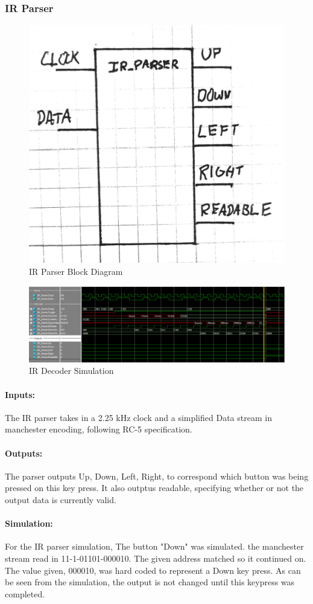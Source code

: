 \documentclass[]{article}
\begin{document}
\subsubsection{IR Parser}
\begin{figure}[H]\centering
    \includegraphics[width=0.5\linewidth]{figures/IR_Parser_Block.jpg}
    \caption{IR Parser Block Diagram}
    \label{fig:irParserBlock}
\end{figure}
\begin{figure}[H]\centering
    \includegraphics[width=\linewidth]{figures/IR_Parser_Sim.png}
    \caption{IR Decoder Simulation}
    \label{fig:irParserSim}
\end{figure}
\paragraph{Inputs:} The IR parser takes in a 2.25 kHz clock and a simplified Data stream in manchester encoding, following RC-5 specification.
\paragraph{Outputs:} The parser outputs Up, Down, Left, Right, to correspond which button was being pressed on this key press. It also outptus readable, specifying whether or not the output data is currently valid.
\paragraph{Simulation:} For the IR parser simulation, The button "Down" was simulated. the manchester stream read in 11-1-01101-000010. The given address matched so it continued on. The value given, 000010, was hard coded to represent a Down key press. As can be seen from the simulation, the output is not changed until this keypress was completed.
\end{document}
